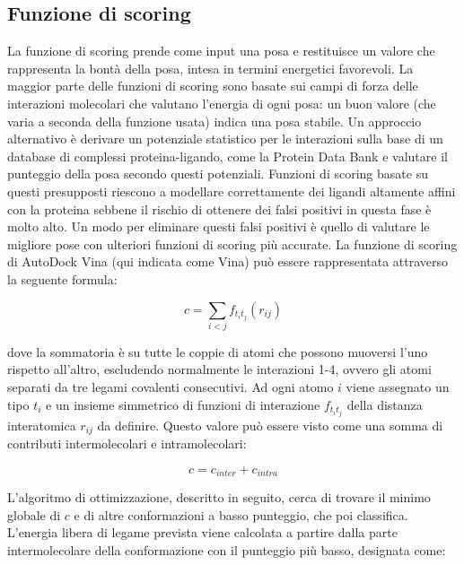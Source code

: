 \subsection{Funzione di scoring}
La funzione di scoring prende come input una posa e restituisce un valore che rappresenta la bontà della posa, intesa in termini energetici favorevoli. La maggior parte delle funzioni di scoring sono basate sui campi di forza delle interazioni molecolari che valutano l’energia di ogni posa: un buon valore (che varia a seconda della funzione usata) indica una posa stabile. Un approccio alternativo è derivare un potenziale statistico per le interazioni sulla base di un database di complessi proteina-ligando, come la Protein Data Bank e valutare il punteggio della posa secondo questi potenziali. Funzioni di scoring basate su questi presupposti riescono a modellare correttamente dei ligandi altamente affini con la proteina sebbene il rischio di ottenere dei falsi positivi in questa fase è molto alto. Un modo per eliminare questi falsi positivi è quello di valutare le migliore pose con ulteriori funzioni
di scoring più accurate.\newline
La funzione di scoring di AutoDock Vina (qui indicata come Vina) può essere rappresentata attraverso la seguente formula:

\begin{equation}
    c = \sum_{i<j}f_{t_it_j}(r_{ij})
\end{equation}

dove la sommatoria è su tutte le coppie di atomi che possono muoversi l'uno rispetto all'altro, escludendo normalmente le interazioni 1-4, ovvero gli atomi separati da tre legami covalenti consecutivi. Ad ogni atomo $i$ viene assegnato un tipo $t_i$ e un insieme simmetrico di funzioni di interazione $f_{t_it_j}$ della distanza interatomica $r_{ij}$ da definire.\newline
Questo valore può essere visto come una somma di contributi intermolecolari e intramolecolari:

\begin{equation}
    c = c_{inter} + c_{intra}
\end{equation}

L'algoritmo di ottimizzazione, descritto in seguito, cerca di trovare il minimo globale di $c$ e di altre conformazioni a basso punteggio, che poi classifica.\newline 
L'energia libera di legame prevista viene calcolata a partire dalla parte intermolecolare della conformazione con il punteggio più basso, designata come:

